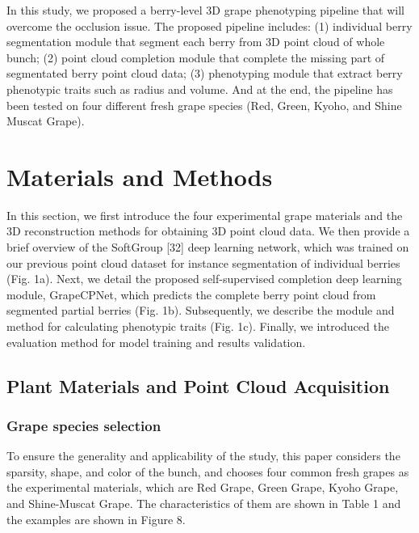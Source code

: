 \documentclass[12pt]{article}
\begin{document}
In this study, we proposed a berry-level 3D grape phenotyping pipeline that will overcome the occlusion issue. 
The proposed pipeline includes: 
(1) individual berry segmentation module that segment each berry from 3D point cloud of whole bunch; 
(2) point cloud completion module that complete the missing part of segmentated berry point cloud data; 
(3) phenotyping module that extract berry phenotypic traits such as radius and volume. 
And at the end, the pipeline has been tested on four different fresh grape species (Red, Green, Kyoho, and Shine Muscat Grape).

\section{Materials and Methods}

In this section, we first introduce the four experimental grape materials and the 3D reconstruction methods for obtaining 3D point cloud data. 
We then provide a brief overview of the SoftGroup [32] deep learning network, which was trained on our previous point cloud dataset for instance segmentation of individual berries (Fig. 1a). 
Next, we detail the proposed self-supervised completion deep learning module, GrapeCPNet, which predicts the complete berry point cloud from segmented partial berries (Fig. 1b). 
Subsequently, we describe the module and method for calculating phenotypic traits (Fig. 1c). 
Finally, we introduced the evaluation method for model training and results validation.


\subsection{Plant Materials and Point Cloud Acquisition}

\subsubsection{Grape species selection}

To ensure the generality and applicability of the study, this paper considers the sparsity, shape, and color of the bunch, and chooses four common fresh grapes as the experimental materials, which are Red Grape, Green Grape, Kyoho Grape, and Shine-Muscat Grape. 
The characteristics of them are shown in Table 1 and the examples are shown in Figure 8.


\end{document}
